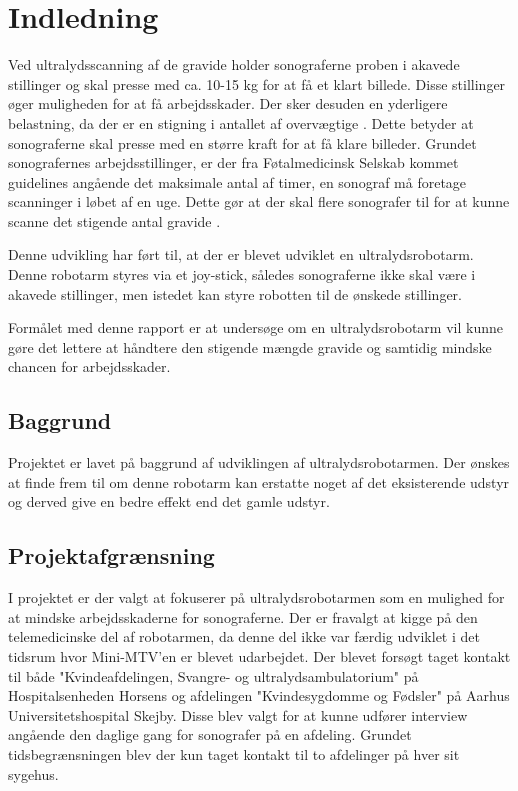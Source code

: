 \chapter{Indledning} 
Ved ultralydsscanning af de gravide holder sonograferne proben i akavede stillinger og skal presse med ca. 10-15 kg for at få et klart billede. Disse stillinger øger muligheden for at få arbejdsskader. Der sker desuden en yderligere belastning, da der er en stigning i antallet af overvægtige \cite{Overvaegt}. Dette betyder at sonograferne skal presse med en større kraft for at få klare billeder. Grundet sonografernes arbejdsstillinger, er der fra Føtalmedicinsk Selskab kommet guidelines angående det maksimale antal af timer, en sonograf må foretage scanninger i løbet af en uge. Dette gør at der skal flere sonografer til for at kunne scanne det stigende antal gravide \cite{Foedsler}.

Denne udvikling har ført til, at der er blevet udviklet en ultralydsrobotarm. Denne robotarm styres via et joy-stick, således sonograferne ikke skal være i akavede stillinger, men istedet kan styre robotten til de ønskede stillinger. 

Formålet med denne rapport er at undersøge om en ultralydsrobotarm vil kunne gøre det lettere at håndtere den stigende mængde gravide og samtidig mindske chancen for arbejdsskader. 

\section{Baggrund}
Projektet er lavet på baggrund af udviklingen af ultralydsrobotarmen. Der ønskes at finde frem til om denne robotarm kan erstatte noget af det eksisterende udstyr og derved give en bedre effekt end det gamle udstyr.

\section{Projektafgrænsning}
 I projektet er der valgt at fokuserer på ultralydsrobotarmen som en mulighed for at mindske arbejdsskaderne for sonograferne. Der er fravalgt at kigge på den telemedicinske del af robotarmen, da denne del ikke var færdig udviklet i det tidsrum hvor Mini-MTV'en er blevet udarbejdet.  
 Der blevet forsøgt taget kontakt til både "Kvindeafdelingen, Svangre- og ultralydsambulatorium" på Hospitalsenheden Horsens og afdelingen "Kvindesygdomme og Fødsler" på Aarhus Universitetshospital Skejby. Disse blev valgt for at kunne udfører interview angående den daglige gang for sonografer på en afdeling. Grundet tidsbegrænsningen blev der kun taget kontakt til to afdelinger på hver sit sygehus. 

\label{version_Systemark}
